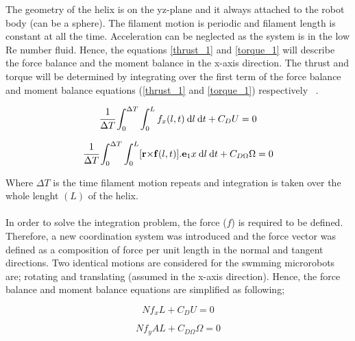 \documentclass[12pt,a4paper,titlepage]{report}
\begin{document}
The geometry
of the helix is on the yz-plane and it always attached to the robot body (can be a sphere). The 
filament motion is periodic and filament length is constant at all the time. Acceleration can be neglected as the
system is in the low Re number fluid. Hence, the equations \ref{thrust_1} and \ref{torque_1} will describe the force balance and 
the moment balance in the x-axis direction. The thrust and torque will be determined by integrating over the 
first term of the force balance and moment balance equations (\ref{thrust_1} and \ref{torque_1}) 
 respectively ~\citep{edd2003biomimetic}.





\begin{equation}
  \cfrac {1} {\Delta T} \int_0^{\Delta T} \int_0^L  f_x(l,t)\: \mathrm{d}l \:\mathrm{d}t + C_DU  = 0
\label{thrust_1}
\end{equation}

\begin{equation}
  \cfrac {1} {\Delta T}  \int_0^{\Delta T} \int_0^L [\bold r \bold \times \bold f(l,t)] . \bold e_1x \: \mathrm{d}l \:\mathrm{d}t + C_{D\Omega}\Omega= 0
\label{torque_1}
\end{equation}

Where $\Delta T$ is the time filament motion repeats and integration is taken over the whole lenght $(L)$ of the
helix. 

\paragraph{}
In order to solve the integration problem, the force ($f$) is required to be defined. Therefore, a new
coordination system was introduced and the force vector was defined as a composition of force per unit length
in the normal and tangent directions. Two identical motions are considered for the swmming microrobots
are; rotating and translating (assumed in the x-axis direction). Hence, the force balance and moment balance 
equations are simplified as following; 


\begin{equation}
Nf_xL  + C_DU  = 0
\label{simple_thrust}
\end{equation}



\begin{equation}
 Nf_yAL + C_{D\Omega}\Omega= 0
\label{simple_torque}
\end{equation}
\end{document}
